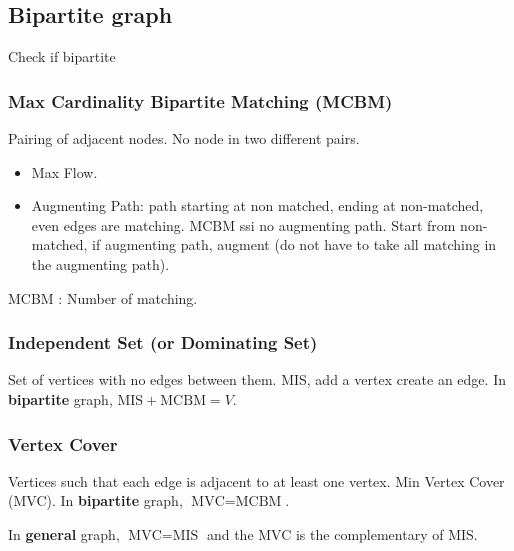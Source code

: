 \subsection{Bipartite graph}
Check if bipartite

\subsubsection{Max Cardinality Bipartite Matching (MCBM)}
Pairing of adjacent nodes. No node in two different pairs.
\begin{itemize}
  \item Max Flow.
  \item Augmenting Path: path starting at non matched, ending
    at non-matched, even edges are matching.
    MCBM ssi no augmenting path.
    Start from non-matched, if augmenting path, augment
    (do not have to take all matching in the augmenting path).
\end{itemize}
MCBM : Number of matching.
\subsubsection{Independent Set (or Dominating Set)}
Set of vertices with no edges between them.
MIS, add a vertex create an edge.
In \textbf{bipartite} graph,
$\text{MIS} + \text{MCBM} = V$.

\subsubsection{Vertex Cover}
Vertices such that each edge is adjacent to at least one vertex.
Min Vertex Cover (MVC). In \textbf{bipartite} graph,
$\text{MVC} = \text{MCBM}$.

In \textbf{general} graph,
$\text{MVC} = \text{MIS}$ and the MVC is the complementary of MIS.


